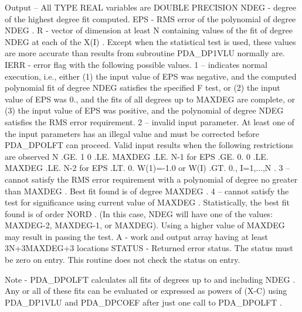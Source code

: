 \documentclass[11pt,twoside,nolof]{starlink}
\begin{document}
\begin{terminalv}
     Output -- All TYPE REAL variables are DOUBLE PRECISION
         NDEG -   degree of the highest degree fit computed.
         EPS -    RMS error of the polynomial of degree  NDEG .
         R -      vector of dimension at least N containing values
                  of the fit of degree  NDEG  at each of the  X(I) .
                  Except when the statistical test is used, these
                  values are more accurate than results from subroutine
                  PDA_DP1VLU  normally are.
         IERR -   error flag with the following possible values.
             1 -- indicates normal execution, i.e., either
                  (1)  the input value of  EPS  was negative, and the
                       computed polynomial fit of degree  NDEG
                       satisfies the specified F test, or
                  (2)  the input value of  EPS  was 0., and the fits of
                       all degrees up to  MAXDEG  are complete, or
                  (3)  the input value of  EPS  was positive, and the
                       polynomial of degree  NDEG  satisfies the RMS
                       error requirement.
             2 -- invalid input parameter.  At least one of the input
                  parameters has an illegal value and must be corrected
                  before  PDA_DPOLFT  can proceed.  Valid input results
                  when the following restrictions are observed
                       N .GE. 1
                       0 .LE. MAXDEG .LE. N-1  for  EPS .GE. 0.
                       0 .LE. MAXDEG .LE. N-2  for  EPS .LT. 0.
                       W(1)=-1.0  or  W(I) .GT. 0., I=1,...,N .
             3 -- cannot satisfy the RMS error requirement with a
                  polynomial of degree no greater than  MAXDEG .  Best
                  fit found is of degree  MAXDEG .
             4 -- cannot satisfy the test for significance using
                  current value of  MAXDEG .  Statistically, the
                  best fit found is of order  NORD .  (In this case,
                  NDEG will have one of the values:  MAXDEG-2,
                  MAXDEG-1, or MAXDEG).  Using a higher value of
                  MAXDEG  may result in passing the test.
         A -      work and output array having at least 3N+3MAXDEG+3
                  locations
         STATUS - Returned error status.
                  The status must be zero on entry. This
                  routine does not check the status on entry.

     Note - PDA_DPOLFT  calculates all fits of degrees up to and including
            NDEG .  Any or all of these fits can be evaluated or
            expressed as powers of (X-C) using  PDA_DP1VLU  and  PDA_DPCOEF
            after just one call to  PDA_DPOLFT .


\end{terminalv}
\end{document}
